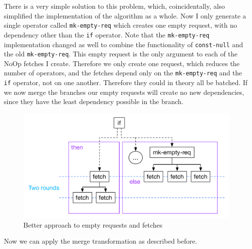 There is a very simple solution to this problem, which, coincidentally, also simplified the implementation of the algorithm as a whole.
Now I only generate a single operator called \texttt{mk-empty-req} which creates one empty request, with no dependency other than the \texttt{if} operator.
Note that the \texttt{mk-empty-req} implementation changed as well to combine the functionality of \texttt{const-null} and the old \texttt{mk-empty-req}.
This empty request is the only argument to each of the NoOp fetches I create.
Therefore we only create one request, which reduces the number of operators, and the fetches depend only on the \texttt{mk-empty-req} and the \texttt{if} operator, not on one another.
Therefore they could in theory all be batched.
If we now merge the branches our empty requests will create no new dependencies, since they have the least dependency possible in the branch.

\begin{figure}
    \includegraphics[width=\linewidth]{../Figures/if-insert-empty-better-after-insert}
    \caption{Better approach to empty requests and fetches}
    \label{if-insert-empty-better-after-insert}
\end{figure}

Now we can apply the merge transformation as described before.
